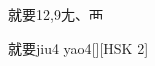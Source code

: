 \begin{entry}{就要}{12,9}{⼪、⾑}
  \begin{phonetics}{就要}{jiu4 yao4}[][HSK 2]
  \end{phonetics}
\end{entry}

